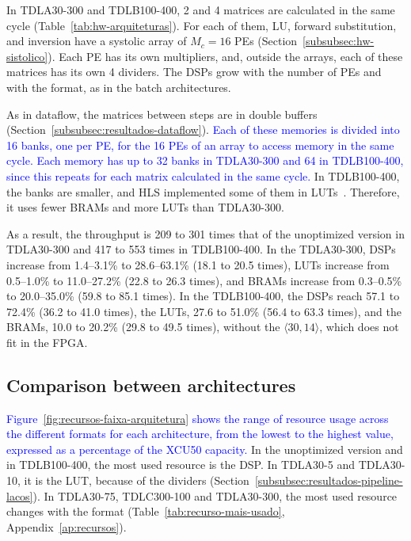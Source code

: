 In TDLA30-300 and TDLB100-400, 2 and 4 matrices are calculated in the same cycle (Table~\ref{tab:hw-arquiteturas}). For each of them, LU, forward substitution, and inversion have a systolic array of $M_c = 16$ PEs (Section~\ref{subsubsec:hw-sistolico}). Each PE has its own multipliers, and, outside the arrays, each of these matrices has its own 4 dividers. The DSPs grow with the number of PEs and with the format, as in the batch architectures.

As in dataflow, the matrices between steps are in double buffers (Section~\ref{subsubsec:resultados-dataflow}). \textcolor{blue}{Each of these memories is divided into 16 banks, one per PE, for the 16 PEs of an array to access memory in the same cycle.} \textcolor{blue}{Each memory has up to 32 banks in TDLA30-300 and 64 in TDLB100-400, since this repeats for each matrix calculated in the same cycle.} In TDLB100-400, the banks are smaller, and HLS implemented some of them in LUTs~\cite[p.~53]{ug1399}. Therefore, it uses fewer BRAMs and more LUTs than TDLA30-300.

As a result, the throughput is 209 to 301 times that of the unoptimized version in TDLA30-300 and 417 to 553 times in TDLB100-400. In the TDLA30-300, DSPs increase from 1.4--3.1\% to 28.6--63.1\% (18.1 to 20.5 times), LUTs increase from 0.5--1.0\% to 11.0--27.2\% (22.8 to 26.3 times), and BRAMs increase from 0.3--0.5\% to 20.0--35.0\% (59.8 to 85.1 times). In the TDLB100-400, the DSPs reach 57.1 to 72.4\% (36.2 to 41.0 times), the LUTs, 27.6 to 51.0\% (56.4 to 63.3 times), and the BRAMs, 10.0 to 20.2\% (29.8 to 49.5 times), without the $\langle 30,14\rangle$, which does not fit in the FPGA.

\subsection{\texorpdfstring{Comparison between architectures}{Comparison between architectures}}\label{subsec:resultados-recursos}

\textcolor{blue}{Figure~\ref{fig:recursos-faixa-arquitetura} shows the range of resource usage across the different formats for each architecture, from the lowest to the highest value, expressed as a percentage of the XCU50 capacity.}
In the unoptimized version and in TDLB100-400, the most used resource is the DSP. In TDLA30-5 and TDLA30-10, it is the LUT, because of the dividers (Section~\ref{subsubsec:resultados-pipeline-lacos}). In TDLA30-75, TDLC300-100 and TDLA30-300, the most used resource changes with the format (Table~\ref{tab:recurso-mais-usado}, Appendix~\ref{ap:recursos}).

